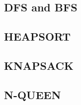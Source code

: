 \documentclass[12pt]{article}
\begin{document}
    \subsection{\textbf{DFS and BFS}}
      
      
    \newpage

    \subsection{\textbf{HEAPSORT}}
      
    \newpage

    \subsection{\textbf{KNAPSACK}}
      
    \newpage

    \subsection{\textbf{N-QUEEN}}
      
    \newpage

\end{document}
